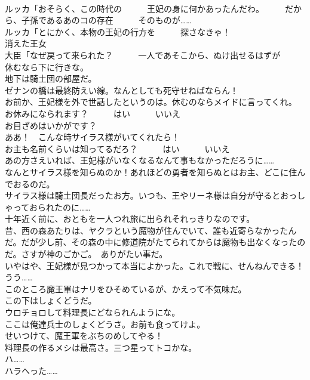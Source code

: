 \documentclass[8pt]{extreport}
\begin{document}
\begin{CJK}{UTF8}{min}
\\	ルッカ「おそらく、この時代の　　　王妃の身に何かあったんだわ。　　　だから、子孫であるあのコの存在　　　そのものが……	
\\	ルッカ「とにかく、本物の王妃の行方を　　　探さなきゃ！	
\\	消えた王女	
\\	大臣「なぜ戻って来られた？　　　一人であそこから、ぬけ出せるはずが　　　
\\	休むなら下に行きな。	
\\	地下は騎土団の部屋だ。	
\\	ゼナンの橋は最終防えい線。なんとしても死守せねばならん！	
\\	お前か、王妃様を外で世話したというのは。休むのならメイドに言ってくれ。	
\\	お休みになられます？　　　はい　　　いいえ	
\\	お目ざめはいかがです？	
\\	ああ！　こんな時サイラス様がいてくれたら！	
\\	お主も名前くらいは知ってるだろ？　　　はい　　　いいえ	
\\	あの方さえいれば、王妃様がいなくなるなんて事もなかっただろうに……	
\\	なんとサイラス様を知らぬのか！あれほどの勇者を知らぬとはお主、どこに住んでおるのだ。	
\\	サイラス様は騎土団長だったお方。いつも、王やリーネ様は自分が守るとおっしゃっておられたのに……	
\\	十年近く前に、おともを一人つれ旅に出られそれっきりなのです。	
\\	昔、西の森あたりは、ヤクラという魔物が住んでいて、誰も近寄らなかったんだ。だが少し前、その森の中に修道院がたてられてからは魔物も出なくなったのだ。さすが神のごかご。　ありがたい事だ。	
\\	いやはや、王妃様が見つかって本当によかった。これで戦に、せんねんできる！	
\\	うう……	
\\	このところ魔王軍はナリをひそめているが、かえって不気味だ。	
\\	この下はしょくどうだ。	
\\	ウロチョロして料理長にどなられんようにな。	
\\	ここは俺達兵士のしょくどうさ。お前も食ってけよ。	
\\	せいつけて、魔王軍をぶちのめしてやる！	
\\	料理長の作るメシは最高さ。三つ星ってトコかな。	
\\	ハ……	
\\	ハラへった……	

\end{CJK}
\end{document}
